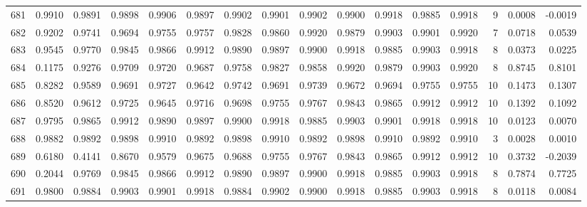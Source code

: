 \begin{tabular}{lrrrrrrrrrrrrrrr}
681 &      0.9910 &  0.9891 &  0.9898 &  0.9906 &  0.9897 &  0.9902 &  0.9901 &  0.9902 &  0.9900 &  0.9918 &   0.9885 &     0.9918 &      9 &                    0.0008 &                    -0.0019 \\
682 &      0.9202 &  0.9741 &  0.9694 &  0.9755 &  0.9757 &  0.9828 &  0.9860 &  0.9920 &  0.9879 &  0.9903 &   0.9901 &     0.9920 &      7 &                    0.0718 &                     0.0539 \\
683 &      0.9545 &  0.9770 &  0.9845 &  0.9866 &  0.9912 &  0.9890 &  0.9897 &  0.9900 &  0.9918 &  0.9885 &   0.9903 &     0.9918 &      8 &                    0.0373 &                     0.0225 \\
684 &      0.1175 &  0.9276 &  0.9709 &  0.9720 &  0.9687 &  0.9758 &  0.9827 &  0.9858 &  0.9920 &  0.9879 &   0.9903 &     0.9920 &      8 &                    0.8745 &                     0.8101 \\
685 &      0.8282 &  0.9589 &  0.9691 &  0.9727 &  0.9642 &  0.9742 &  0.9691 &  0.9739 &  0.9672 &  0.9694 &   0.9755 &     0.9755 &     10 &                    0.1473 &                     0.1307 \\
686 &      0.8520 &  0.9612 &  0.9725 &  0.9645 &  0.9716 &  0.9698 &  0.9755 &  0.9767 &  0.9843 &  0.9865 &   0.9912 &     0.9912 &     10 &                    0.1392 &                     0.1092 \\
687 &      0.9795 &  0.9865 &  0.9912 &  0.9890 &  0.9897 &  0.9900 &  0.9918 &  0.9885 &  0.9903 &  0.9901 &   0.9918 &     0.9918 &     10 &                    0.0123 &                     0.0070 \\
688 &      0.9882 &  0.9892 &  0.9898 &  0.9910 &  0.9892 &  0.9898 &  0.9910 &  0.9892 &  0.9898 &  0.9910 &   0.9892 &     0.9910 &      3 &                    0.0028 &                     0.0010 \\
689 &      0.6180 &  0.4141 &  0.8670 &  0.9579 &  0.9675 &  0.9688 &  0.9755 &  0.9767 &  0.9843 &  0.9865 &   0.9912 &     0.9912 &     10 &                    0.3732 &                    -0.2039 \\
690 &      0.2044 &  0.9769 &  0.9845 &  0.9866 &  0.9912 &  0.9890 &  0.9897 &  0.9900 &  0.9918 &  0.9885 &   0.9903 &     0.9918 &      8 &                    0.7874 &                     0.7725 \\
691 &      0.9800 &  0.9884 &  0.9903 &  0.9901 &  0.9918 &  0.9884 &  0.9902 &  0.9900 &  0.9918 &  0.9885 &   0.9903 &     0.9918 &      8 &                    0.0118 &                     0.0084 \\

\end{tabular}
